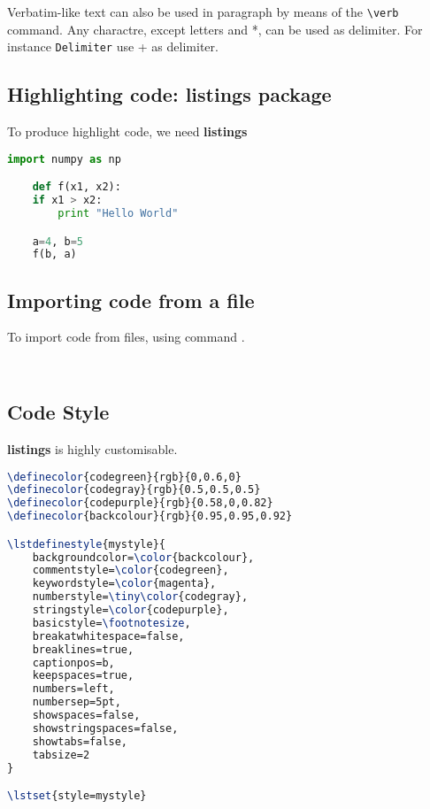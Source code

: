 Verbatim-like text can also be used in paragraph by means of the
\verb|\verb| command. Any charactre, except letters and *, can be used as
delimiter. For instance \verb+Delimiter+ use + as delimiter.

\subsection{Highlighting code: listings package}
To produce highlight code, we need \textbf{listings}
\begin{lstlisting}[language=Python]
    import numpy as np

    def f(x1, x2):
	if x1 > x2:
	    print "Hello World"

    a=4, b=5
    f(b, a)
\end{lstlisting}

\subsection{Importing code from a file}
To import code from files, using command \verb||.
\begin{lstlisting}[language=TeX]



\end{lstlisting}

\subsection{Code Style}
\textbf{listings} is highly customisable.  
\begin{lstlisting}[language=TeX]
\definecolor{codegreen}{rgb}{0,0.6,0}
\definecolor{codegray}{rgb}{0.5,0.5,0.5}
\definecolor{codepurple}{rgb}{0.58,0,0.82}
\definecolor{backcolour}{rgb}{0.95,0.95,0.92}

\lstdefinestyle{mystyle}{
    backgroundcolor=\color{backcolour},   
    commentstyle=\color{codegreen},
    keywordstyle=\color{magenta},
    numberstyle=\tiny\color{codegray},
    stringstyle=\color{codepurple},
    basicstyle=\footnotesize,
    breakatwhitespace=false,         
    breaklines=true,                 
    captionpos=b,                    
    keepspaces=true,                 
    numbers=left,                    
    numbersep=5pt,                  
    showspaces=false,                
    showstringspaces=false,
    showtabs=false,                  
    tabsize=2
}

\lstset{style=mystyle}
\end{lstlisting}

